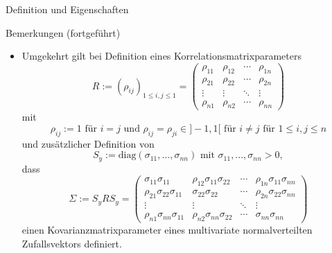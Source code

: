 \documentclass[
  8pt,
  ignorenonframetext,
]{beamer}
\providecommand{\tightlist}{%
  \setlength{\itemsep}{0pt}\setlength{\parskip}{0pt}}
\begin{document}
\begin{frame}{Definition und Eigenschaften}
\protect\hypertarget{definition-und-eigenschaften-5}{}
\footnotesize

Bemerkungen (fortgeführt)

\begin{itemize}
\tightlist
\item
  Umgekehrt gilt bei Definition eines Korrelationsmatrixparameters
  \begin{equation}
  R
  := \left(\rho_{ij}\right)_{1 \le i,j \le 1}
  =
  \begin{pmatrix}
  \rho_{11}
  & \rho_{12}
  & \cdots
  & \rho_{1n}
  \\
  \rho_{21}
  & \rho_{22}
  & \cdots
  & \rho_{2n}
  \\
  \vdots
  & \vdots
  & \ddots
  & \vdots
  \\
  \rho_{n1}
  & \rho_{n2}
  & \cdots
  & \rho_{nn}
  \end{pmatrix}
  \end{equation} mit \begin{equation}
  \rho_{ij} := 1 \mbox{ für } i = j
  \mbox{ und }
  \rho_{ij} = \rho_{ji} \in ]-1,1[ \mbox{ für } i \neq j
  \mbox{ für } 1 \le i,j \le n
  \end{equation} und zusätzlicher Definition von \begin{equation}
  S_{y} := \mbox{diag}(\sigma_{11}, ...,\sigma_{nn})
  \mbox{ mit } \sigma_{11},...,\sigma_{nn} > 0,
  \end{equation} dass \begin{equation}
  \Sigma
  := S_y R S_y
  = \begin{pmatrix}
  \sigma_{11}\sigma_{11}
  & \rho_{12}\sigma_{11}\sigma_{22}
  & \cdots
  & \rho_{1n}\sigma_{11}\sigma_{nn}
  \\
  \rho_{21}\sigma_{22}\sigma_{11}
  & \sigma_{22}\sigma_{22}
  & \cdots
  & \rho_{2n}\sigma_{22}\sigma_{nn}
  \\
  \vdots
  & \vdots
  & \ddots
  & \vdots
  \\
  \rho_{n1}\sigma_{nn}\sigma_{11}
  & \rho_{n2}\sigma_{nn}\sigma_{22}
  & \cdots
  & \sigma_{nn}\sigma_{nn}
  \end{pmatrix}
  \end{equation} einen Kovarianzmatrixparameter eines multivariate
  normalverteilten Zufallsvektors definiert.
\end{itemize}
\end{frame}
\end{document}
